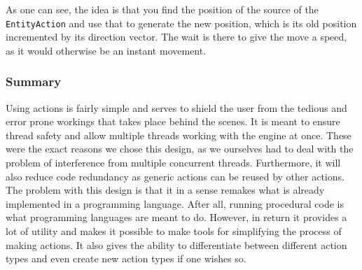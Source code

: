 As one can see, the idea is that you find the position of the source
of the \texttt{EntityAction} and use that to generate the new position,
which is its old position incremented by its direction vector. The
wait is there to give the move a speed, as it would otherwise be an
instant movement.


\subsubsection{Summary}

Using actions is fairly simple and serves to shield the user from
the tedious and error prone workings that takes place behind the scenes.
It is meant to ensure thread safety and allow multiple threads working
with the engine at once. These were the exact reasons we chose this
design, as we ourselves had to deal with the problem of interference
from multiple concurrent threads. Furthermore, it will also reduce
code redundancy as generic actions can be reused by other actions.
The problem with this design is that it in a sense remakes what is
already implemented in a programming language. After all, running
procedural code is what programming languages are meant to do. However,
in return it provides a lot of utility and makes it possible to make
tools for simplifying the process of making actions. It also gives
the ability to differentiate between different action types and even
create new action types if one wishes so.
